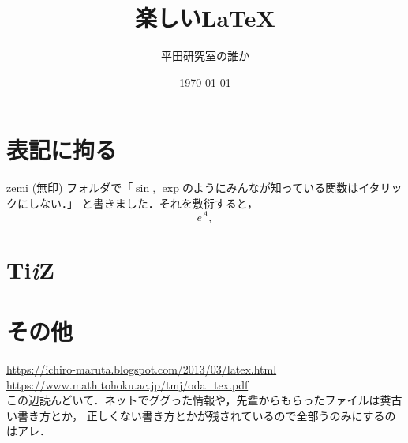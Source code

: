 \documentclass[a4j, twocolumn]{jsarticle}
\title{楽しい\LaTeX}
\author{平田研究室の誰か}
\date{\today}
\begin{document}
\maketitle
\pagestyle{fancy}
\section{表記に拘る}
  zemi (無印) フォルダで「$\sin$, $\exp$のようにみんなが知っている関数はイタリックにしない．」
  と書きました．それを敷衍すると，
    \[
      e^{A},
    \]

\section{Ti\textit{i}Z}

\lipsum[1-5]


\section{その他}
  \noindent \url{https://ichiro-maruta.blogspot.com/2013/03/latex.html} \\
  \url{https://www.math.tohoku.ac.jp/tmj/oda_tex.pdf}\\
  この辺読んどいて．ネットでググった情報や，先輩からもらったファイルは糞古い書き方とか，
  正しくない書き方とかが残されているので全部うのみにするのはアレ．
\end{document}
